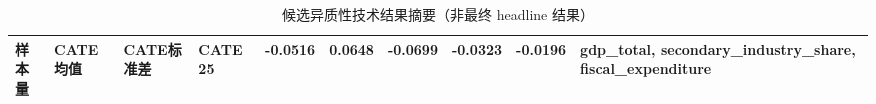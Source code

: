 \begin{table}
\caption{候选异质性技术结果摘要（非最终 headline 结果）}
\label{tab:heterogeneity_candidate}
\begin{tabular}{lllllll}
\toprule
样本量 & CATE均值 & CATE标准差 & CATE 25%
 & -0.0516 & 0.0648 & -0.0699 & -0.0323 & -0.0196 & gdp_total, secondary_industry_share, fiscal_expenditure \\
\bottomrule
\end{tabular}
\end{table}
